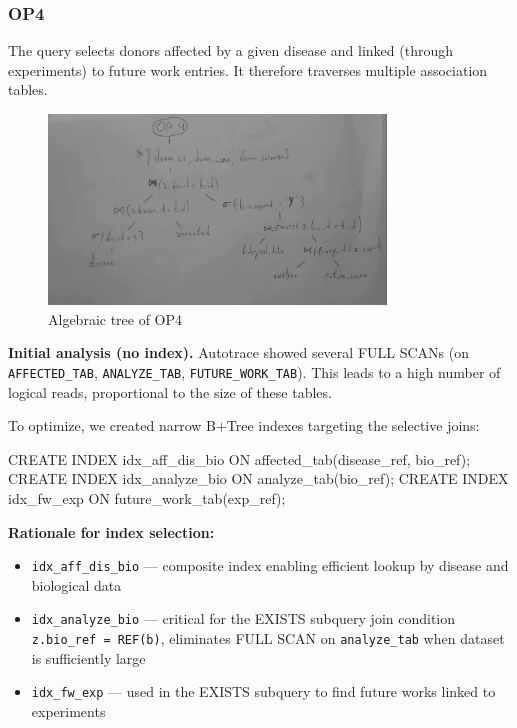 \documentclass[11pt,a4paper]{article}
\begin{document}
\subsubsection*{OP4}

The query selects donors affected by a given disease and linked (through experiments) to future work entries. It therefore traverses multiple association tables.  

\begin{figure}[H]
  \centering
  \includegraphics[width=0.8\textwidth]{img/op4_algebra.png}
  \caption{Algebraic tree of OP4}
\end{figure}

\textbf{Initial analysis (no index).} Autotrace showed several FULL SCANs (on \texttt{AFFECTED\_TAB}, \texttt{ANALYZE\_TAB}, \texttt{FUTURE\_WORK\_TAB}). This leads to a high number of logical reads, proportional to the size of these tables.  

To optimize, we created narrow B+Tree indexes targeting the selective joins:  

\begin{sqlbox}
CREATE INDEX idx_aff_dis_bio ON affected_tab(disease_ref, bio_ref);
CREATE INDEX idx_analyze_bio ON analyze_tab(bio_ref);
CREATE INDEX idx_fw_exp      ON future_work_tab(exp_ref);
\end{sqlbox}

\textbf{Rationale for index selection:}
\begin{itemize}
    \item \texttt{idx\_aff\_dis\_bio} — composite index enabling efficient lookup by disease and biological data
    \item \texttt{idx\_analyze\_bio} — critical for the EXISTS subquery join condition \texttt{z.bio\_ref = REF(b)}, eliminates FULL SCAN on \texttt{analyze\_tab} when dataset is sufficiently large
    \item \texttt{idx\_fw\_exp} — used in the EXISTS subquery to find future works linked to experiments
\end{itemize}
\end{document}
